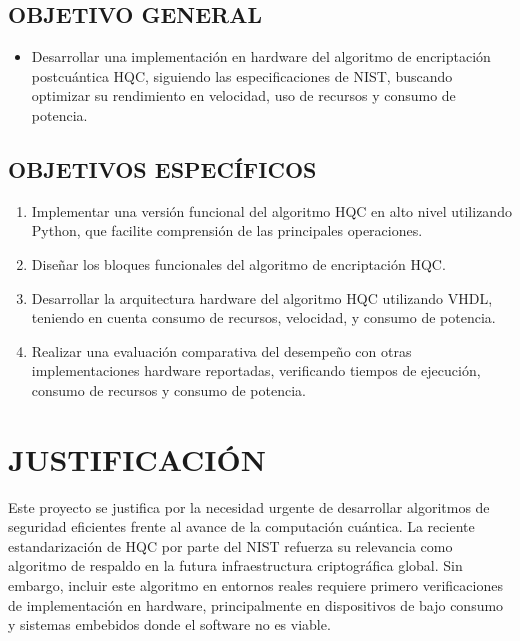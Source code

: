 \section{OBJETIVO GENERAL}

\begin{itemize}
    \item Desarrollar una implementación en hardware del algoritmo de encriptación postcuántica HQC, siguiendo las especificaciones de NIST, buscando optimizar su rendimiento en velocidad, uso de recursos y consumo de potencia.
\end{itemize}

\vspace{-1.6em}

\section{OBJETIVOS ESPECÍFICOS}

\begin{enumerate}
    \item Implementar una versión funcional del algoritmo HQC en alto nivel utilizando Python, que facilite comprensión de las principales operaciones.

    \item Diseñar los bloques funcionales del algoritmo de encriptación HQC.

    \item Desarrollar la arquitectura hardware del algoritmo HQC utilizando VHDL, teniendo en cuenta consumo de recursos, velocidad, y consumo de potencia.

    \item Realizar una evaluación comparativa del desempeño con otras implementaciones hardware reportadas, verificando tiempos de ejecución, consumo de recursos y consumo de potencia.

\end{enumerate}

\chapter{JUSTIFICACIÓN}

Este proyecto se justifica por la necesidad urgente de desarrollar algoritmos de seguridad eficientes frente al avance de la computación cuántica. La reciente estandarización de HQC por parte del NIST refuerza su relevancia como algoritmo de respaldo en la futura infraestructura criptográfica global. Sin embargo, incluir este algoritmo en entornos reales requiere primero verificaciones de implementación en hardware, principalmente en dispositivos de bajo consumo y sistemas embebidos donde el software no es viable.

